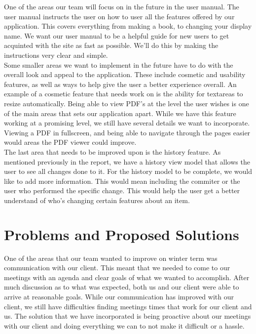 \documentclass[onecolumn, draftclsnofoot,10pt, compsoc]{IEEEtran}
\begin{document}
\noindent One of the areas our team will focus on in the future in the user manual. The user manual instructs 
the user on how to user all the features offered by our application. This covers everything from making 
a book, to changing your display name. We want our user manual to be a helpful guide for new users to get
acquinted with the site as fast as possible. We'll do this by making the instructions very clear and simple. \\

\noindent Some smaller areas we want to implement in the future have to do with the overall look and appeal
to the application. These include cosmetic and usability features, as well as ways to help give the user
a better experience overall. An example of a cosmetic feature that needs work on is the ability for textareas 
to resize automatically. Being able to view PDF's at the level the user wishes is one of the main areas that
sets our application apart. While we have this feature working at a promising level, we still have several 
details we want to incorporate. Viewing a PDF in fullscreen, and being able to navigate through the pages 
easier would areas the PDF viewer could improve. \\

\noindent The last area that needs to be improved upon is the history feature. As mentioned previously in the
report, we have a history view model that allows the user to see all changes done to it. For the history model 
to be complete, we would like to add more information. This would mean including the commiter or the user who 
performed the specific change. This would help the user get a better understand of who's changing certain 
features about an item. \\

\newpage

\section{Problems and Proposed Solutions} 

\noindent One of the areas that our team wanted to improve on winter term was communication with our client.
This meant that we needed to come to our meetings with an agenda and clear goals of what we wanted to 
accomplish. After much discussion as to what was expected, both us and our client were able to arrive at 
reasonable goals. While our communication has improved with our client, we still have difficulties finding 
meetings times that work for our client and us. The solution that we have incorporated is being proactive
about our meetings with our client and doing everything we can to not make it difficult or a hassle.\\
\end{document}
